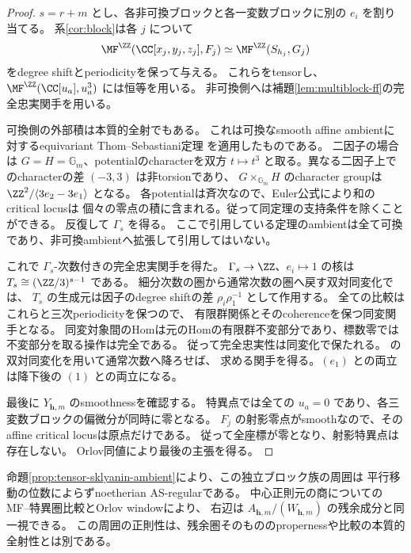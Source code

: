 \begin{proof}
 \(s=r+m\) とし、各非可換ブロックと各一変数ブロックに別の \(e_i\) を割り当てる。
 系\ref{cor:block}は各 \(j\) について
 \[
 \MF^{\ZZ}(\CC[x_j,y_j,z_j],F_j)
 \simeq\MF^{\ZZ}(S_{h_j},G_j)
 \]
 をdegree shiftとperiodicityを保って与える。
 これらをtensorし、\(\MF^{\ZZ}(\CC[u_a],u_a^3)\) には恒等を用いる。
 非可換側へは補題\ref{lem:multiblock-ff}の完全忠実関手を用いる。

 可換側の外部積は本質的全射でもある。
 これは可換なsmooth affine ambientに対するequivariant Thom--Sebastiani定理
 \cite[Theorem 5.15, Corollary 5.18]{BFK}を適用したものである。
 二因子の場合は \(G=H=\mathbb G_m\)、potentialのcharacterを双方 \(t\mapsto t^3\)
 と取る。異なる二因子上でのcharacterの差 \((-3,3)\) は非torsionであり、
 \(G\times_{\mathbb G_m}H\) のcharacter groupは
 \(\ZZ^2/\langle3e_2-3e_1\rangle\) となる。
 各potentialは斉次なので、Euler公式により和のcritical locusは
 個々の零点の積に含まれる。従って同定理の支持条件を除くことができる。
 反復して \(\Gamma_s\) を得る。
 ここで引用している定理のambientは全て可換であり、非可換ambientへ拡張して引用してはいない。

 これで \(\Gamma_s\)-次数付きの完全忠実関手を得た。
 \(\Gamma_s\to\ZZ\)、\(e_i\mapsto1\) の核は
 \(T_s\cong(\ZZ/3)^{s-1}\) である。
 細分次数の圏から通常次数の圏へ戻す双対同変化では、
 \(T_s\) の生成元は因子のdegree shiftの差
 \(\rho_i\rho_1^{-1}\) として作用する。
 全ての比較はこれらと三次periodicityを保つので、
 有限群関係とそのcoherenceを保つ同変関手となる。
 同変対象間のHomは元のHomの有限群不変部分であり、標数零では不変部分を取る操作は完全である。
 従って完全忠実性は同変化で保たれる。
 \cite[Theorem 4.2 and Section 8]{Elagin}の双対同変化を用いて通常次数へ降ろせば、
 求める関手を得る。\((e_1)\) との両立は降下後の \((1)\) との両立になる。

 最後に \(Y_{\mathbf h,m}\) のsmoothnessを確認する。
 特異点では全ての \(u_a=0\) であり、各三変数ブロックの偏微分が同時に零となる。
 \(F_j\) の射影零点がsmoothなので、そのaffine critical locusは原点だけである。
 従って全座標が零となり、射影特異点は存在しない。
 Orlov同値により最後の主張を得る。
\end{proof}

\begin{remark}
 命題\ref{prop:tensor-sklyanin-ambient}により、この独立ブロック族の周囲は
 平行移動の位数によらずnoetherian AS-regularである。
 中心正則元の商についてのMF--特異圏比較とOrlov windowにより、
 右辺は \(A_{\mathbf h,m}/(W_{\mathbf h,m})\) の残余成分と同一視できる。
 この周囲の正則性は、残余圏そのもののpropernessや比較の本質的全射性とは別である。
\end{remark}

